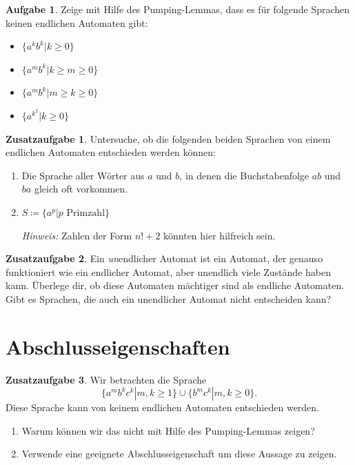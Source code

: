 \documentclass[a4paper,ngerman,12pt]{scrartcl}
\theoremstyle{definition}
\newtheorem{aufg}{Aufgabe}
\newtheorem{zaufg}{Zusatzaufgabe}
\theoremstyle{plain}
\theoremstyle{remark}
\begin{document}
\begin{aufg}
	Zeige mit Hilfe des Pumping-Lemmas, dass es für folgende Sprachen keinen endlichen Automaten gibt:
	\begin{itemize}
		\item $\{a^kb^k | k \geq 0 \}$
		\item $\{a^mb^k | k \geq m \geq 0 \}$
		\item $\{a^mb^k | m \geq k \geq 0 \}$
		\item $\{a^{k^2} | k \geq 0 \}$
	\end{itemize}
\end{aufg}

\begin{zaufg}
	Untersuche, ob die folgenden beiden Sprachen von einem endlichen Automaten entschieden werden können:
	\begin{enumerate}[label=\alph*)]
		\item Die Sprache aller Wörter aus $a$ und $b$, in denen die Buchstabenfolge $ab$ und $ba$ gleich oft vorkommen.
		\item $S \coloneqq \{a^p | p \text{ Primzahl}\}$
		
		\textit{Hinweis:} Zahlen der Form $n!+2$ könnten hier hilfreich sein.		
	\end{enumerate}
\end{zaufg}

\begin{zaufg}
	Ein \emph{un}endlicher Automat ist ein Automat, der genauso funktioniert wie ein endlicher Automat, aber unendlich viele Zustände haben kann. Überlege dir, ob diese Automaten mächtiger sind als endliche Automaten. Gibt es Sprachen, die auch ein unendlicher Automat nicht entscheiden kann?
\end{zaufg}

\section{Abschlusseigenschaften}

\begin{zaufg}
	Wir betrachten die Sprache
		\[\{a^mb^kc^k | m,k \geq 1\} \cup \{b^mc^k | m,k \geq 0\}.\]
	Diese Sprache kann von keinem endlichen Automaten entschieden werden.
	\begin{enumerate}[label=\alph*)]
		\item Warum können wir das nicht mit Hilfe des Pumping-Lemmas zeigen?
		\item Verwende eine geeignete Abschlusseigenschaft um diese Aussage zu zeigen.
	\end{enumerate}
\end{zaufg}
\end{document}
